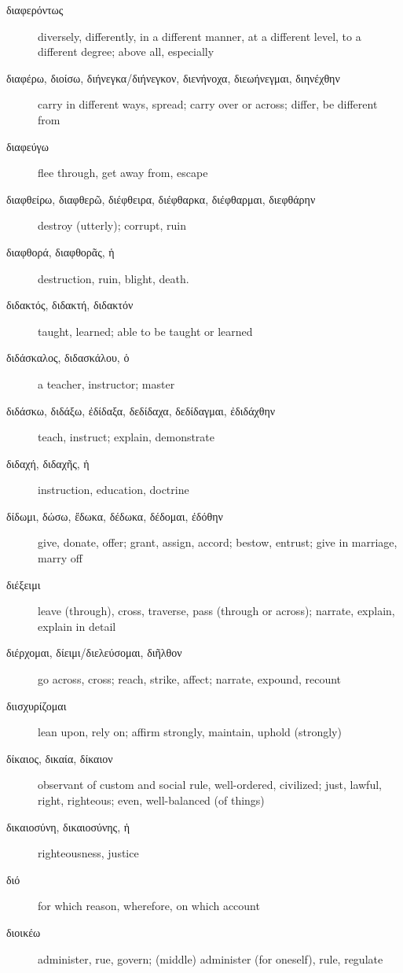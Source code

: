 \documentclass[12pt,letterpaper]{article}
\begin{document}
\begin{description}
    \item[\textgreek{διαφερόντως}] diversely, differently, in a different manner, at a different level, to a different degree; above all, especially
    \item[\textgreek{διαφέρω, διοίσω, διήνεγκα/διήνεγκον, διενήνοχα, διεωήνεγμαι, διηνέχθην}] \marginnote{*}carry in different ways, spread; carry over or across; differ, be different from
    \item[\textgreek{διαφεύγω}] flee through, get away from, escape
    \item[\textgreek{διαφθείρω, διαφθερῶ, διέφθειρα, διέφθαρκα, διέφθαρμαι, διεφθάρην}] \marginnote{*}destroy (utterly); corrupt, ruin
    \item[\textgreek{διαφθορά, διαφθορᾶς, ἡ}] destruction, ruin, blight, death.
    \item[\textgreek{διδακτός, διδακτή, διδακτόν}] taught, learned; able to be taught or learned
    \item[\textgreek{διδάσκαλος, διδασκάλου, ὁ}] a teacher, instructor; master
    \item[\textgreek{διδάσκω, διδάξω, ἐδίδαξα, δεδίδαχα, δεδίδαγμαι, ἐδιδάχθην}] \marginnote{*}teach, instruct; explain, demonstrate
    \item[\textgreek{διδαχή, διδαχῆς, ἡ}] instruction, education, doctrine
    \item[\textgreek{δίδωμι, δώσω, ἔδωκα, δέδωκα, δέδομαι, ἐδόθην}] \marginnote{*}give, donate, offer; grant, assign, accord; bestow, entrust; give in marriage, marry off
    \item[\textgreek{διέξειμι}] leave (through), cross, traverse, pass (through or across); narrate, explain, explain in detail
    \item[\textgreek{διέρχομαι, δίειμι/διελεύσομαι, διῆλθον}] go across, cross; reach, strike, affect; narrate, expound, recount
    \item[\textgreek{διισχυρίζομαι}] lean upon, rely on; affirm strongly, maintain, uphold (strongly)
    \item[\textgreek{δίκαιος, δικαία, δίκαιον}] \marginnote{*}observant of custom and social rule, well-ordered, civilized; just, lawful, right, righteous; even, well-balanced (of things)
    \item[\textgreek{δικαιοσύνη, δικαιοσύνης, ἡ}] righteousness, justice
    \item[\textgreek{διό}] for which reason, wherefore, on which account
    \item[\textgreek{διοικέω}] administer, rue, govern; (middle) administer (for oneself), rule, regulate

\end{description}
\end{document}
